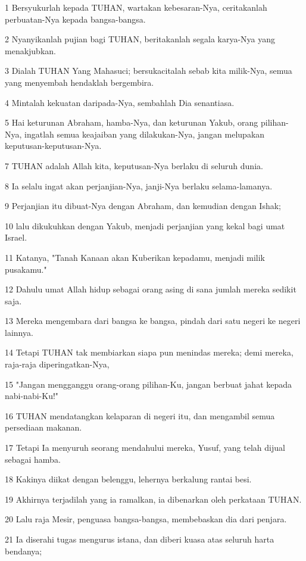 \par 1 Bersyukurlah kepada TUHAN, wartakan kebesaran-Nya, ceritakanlah perbuatan-Nya kepada bangsa-bangsa.
\par 2 Nyanyikanlah pujian bagi TUHAN, beritakanlah segala karya-Nya yang menakjubkan.
\par 3 Dialah TUHAN Yang Mahasuci; bersukacitalah sebab kita milik-Nya, semua yang menyembah hendaklah bergembira.
\par 4 Mintalah kekuatan daripada-Nya, sembahlah Dia senantiasa.
\par 5 Hai keturunan Abraham, hamba-Nya, dan keturunan Yakub, orang pilihan-Nya, ingatlah semua keajaiban yang dilakukan-Nya, jangan melupakan keputusan-keputusan-Nya.
\par 7 TUHAN adalah Allah kita, keputusan-Nya berlaku di seluruh dunia.
\par 8 Ia selalu ingat akan perjanjian-Nya, janji-Nya berlaku selama-lamanya.
\par 9 Perjanjian itu dibuat-Nya dengan Abraham, dan kemudian dengan Ishak;
\par 10 lalu dikukuhkan dengan Yakub, menjadi perjanjian yang kekal bagi umat Israel.
\par 11 Katanya, "Tanah Kanaan akan Kuberikan kepadamu, menjadi milik pusakamu."
\par 12 Dahulu umat Allah hidup sebagai orang asing di sana jumlah mereka sedikit saja.
\par 13 Mereka mengembara dari bangsa ke bangsa, pindah dari satu negeri ke negeri lainnya.
\par 14 Tetapi TUHAN tak membiarkan siapa pun menindas mereka; demi mereka, raja-raja diperingatkan-Nya,
\par 15 "Jangan mengganggu orang-orang pilihan-Ku, jangan berbuat jahat kepada nabi-nabi-Ku!"
\par 16 TUHAN mendatangkan kelaparan di negeri itu, dan mengambil semua persediaan makanan.
\par 17 Tetapi Ia menyuruh seorang mendahului mereka, Yusuf, yang telah dijual sebagai hamba.
\par 18 Kakinya diikat dengan belenggu, lehernya berkalung rantai besi.
\par 19 Akhirnya terjadilah yang ia ramalkan, ia dibenarkan oleh perkataan TUHAN.
\par 20 Lalu raja Mesir, penguasa bangsa-bangsa, membebaskan dia dari penjara.
\par 21 Ia diserahi tugas mengurus istana, dan diberi kuasa atas seluruh harta bendanya;
